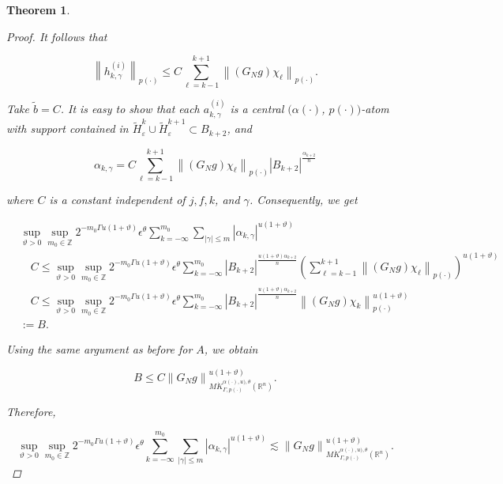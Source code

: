 \documentclass[oneside,reqno]{amsart}
\newtheorem{theorem}{Theorem}[section]
\numberwithin{equation}{section}
\theoremstyle{definition}
\begin{document}
\begin{theorem}
\begin{proof}
It follows that


\begin{equation*}
\left\|h_{k, \gamma}^{(i)}\right\|_{{p(\cdot)}} \leq  C \sum_{\ell=k-1}^{k+1}\left\|\left(G_{N}g \right) \chi_\ell \right\|_{{p(\cdot)}} . 
\end{equation*}


Take $\widetilde{b}=C$. It is easy to show that each $a_{k, \gamma}^{(i)}$ is a central $(\alpha(\cdot)$, $p(\cdot))$-atom with support contained in $\widetilde{H}^k_{ \varepsilon} \cup \widetilde{H}^{k+1}_{ \varepsilon} \subset B_{k+2}$, and


\begin{equation*}
\alpha_{k, \gamma}=C \sum_{\ell=k-1}^{k+1}\left\|\left(G_{N}g \right) \chi_\ell \right\|_{{p(\cdot)}}\left|B_{k+2}\right|^{\frac{\alpha_{k+2}}{n}} 
\end{equation*}


where $C$ is a constant independent of $j, f, k$, and $\gamma$. Consequently, we get


\begin{align*}
& \sup_{\vartheta>0 } \sup _{m_0\in  \mathbb{Z}} 2^{-m_0\Gamma u(1+\vartheta)}\epsilon  ^\theta \sum_{k=-\infty}^{m_0} \sum_{|\gamma|\leq m}\left|\alpha_{k, \gamma}\right|^{u(1+\vartheta)} \\
& \quad C\leq \sup_{\vartheta>0 } \sup _{m_0\in  \mathbb{Z}} 2^{-m_0\Gamma u(1+\vartheta)}\epsilon  ^\theta\sum_{k=-\infty}^{m_0}\left|B_{k+2}\right|^{\frac{u(1+\vartheta) \alpha_{k+2}}  {n}}\left(\sum_{\ell=k-1}^{k+1}\left\|\left(G_{N}g \right) \chi_\ell \right\|_{{p(\cdot)}}\right)^{u(1+\vartheta)} \\
& \quad C\leq  \sup_{\vartheta>0 } \sup _{m_0\in  \mathbb{Z}} 2^{-m_0\Gamma u(1+\vartheta)}\epsilon  ^\theta \sum_{k=-\infty}^{m_0}\left|B_{k+2}\right|^{\frac{u(1+\vartheta) \alpha_{k+2}}  {n}}\left\|\left(G_{N}g \right) \chi_{k}\right\|_{{p(\cdot)}}^{u(1+\vartheta)} \\
& :=B . 
\end{align*}


Using the same argument as before for $A$, we obtain


\begin{equation*}
B \leq C\left\|G_{N}g \right\|_{M \dot{K} ^{\alpha(\cdot),u),\theta}_{ \Gamma, p(\cdot)}(\mathbb{R}^n)}^{u(1+\vartheta)} .
\end{equation*}


Therefore,


\begin{equation*}
\sup_{\vartheta>0 } \sup _{m_0\in  \mathbb{Z}} 2^{-m_0\Gamma u(1+\vartheta)}\epsilon  ^\theta \sum_{k=-\infty}^{m_0} \sum_{|\gamma|\leq m}\left|\alpha_{k, \gamma}\right|^{u(1+\vartheta)} \lesssim\left\|G_{N}g \right\|_{M \dot{K} ^{\alpha(\cdot),u),\theta}_{ \Gamma, p(\cdot)}(\mathbb{R}^n)}^{u(1+\vartheta)} . 
\end{equation*}



\end{proof}
\end{theorem}
\end{document}
